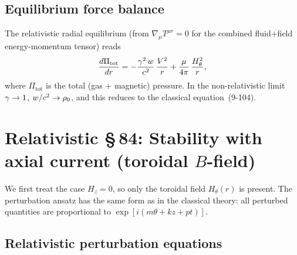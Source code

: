 \subsection{Equilibrium force balance}

The relativistic radial equilibrium (from $\nabla_\mu T^{\mu r} = 0$
for the combined fluid+field energy-momentum tensor) reads
\begin{equation}
  \frac{d\Pi_{\mathrm{tot}}}{dr}
  = -\frac{\gamma^{2}\,w}{c^{2}}\,\frac{V^{2}}{r}
    + \frac{\mu}{4\pi}\,\frac{H_\theta^{2}}{r},
  \label{eq:rel9-equil}
\end{equation}
where $\Pi_{\mathrm{tot}}$ is the total (gas + magnetic) pressure.
In the non-relativistic limit $\gamma \to 1$,
$w/c^{2} \to \rho_0$, and this reduces to the classical
equation~(9-104).

\section{Relativistic \S\,84: Stability with axial current
  (toroidal $B$-field)}
\label{sec:rel9-84}

We first treat the case $H_z = 0$, so only the toroidal field
$H_\theta(r)$ is present.  The perturbation ansatz has the same
form as in the classical theory: all perturbed quantities are
proportional to $\exp[i(m\theta + kz + pt)]$.

\subsection{Relativistic perturbation equations}

